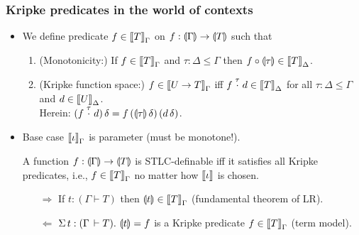 \documentclass[t,fleqn,usenames,dvipsnames]{beamer}
\begin{document}
\begin{frame}%
  \frametitle{Kripke predicates in the world of contexts}
  \vspace{-3ex}
  \begin{itemize}
  \item We define predicate $f \in \Den T \Gamma$ on
    $f : \denty\Gamma \to \denty T$ such that
    \begin{enumerate}
    \item (Monotonicity:)  If $f \in \Den T \Gamma$ and $\tau : \Delta
      \leq \Gamma$ then $f \comp \denty\tau \in \Den T \Delta$.
    \item (Kripke function space:)  $f \in \Den{U \to T}\Gamma$ iff $f
      \stackrel\tau\cdot d \in \Den T \Delta$ for all $\tau :
      \Delta \leq \Gamma$ and $d \in \Den U \Delta$.\\
      Herein: $(f \stackrel\tau\cdot d)\,\delta =
      f\,(\denty\tau\,\delta)\,(d\,\delta)$.
    \end{enumerate}
  \item Base case $\Den \iota \Gamma$ is parameter (must be
    monotone!).
    \begin{theorem}
      A function $f : \denty\Gamma \to \denty T$ is STLC-definable iff
      it satisfies all Kripke predicates, i.e., $f \in \Den T \Gamma$
      no matter how $\den \iota$ is chosen.
    \end{theorem}
    \begin{enumerate}
    \item[$\Rightarrow$] If $t : (\Gamma \vdash T)$ then $\denty t \in
      \Den T \Gamma$ (fundamental theorem of LR).
    \item[$\Leftarrow$] $\Sigma\, t : (\Gamma \der T).\ \denty t = f$
      is a Kripke predicate $f \in \Den T \Gamma$
      (term model).
    \end{enumerate}
  \end{itemize}
\end{frame}
\end{document}
